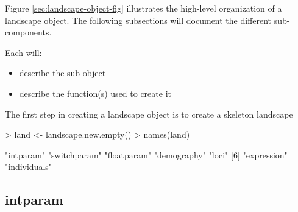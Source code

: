\documentclass[10pt]{article}
\begin{document}
Figure \ref{sec:landscape-object-fig} illustrates the high-level
organization of a landscape object.  The following subsections will
document the different sub-components.

Each will:
\begin{itemize}
\item describe the sub-object
\item describe the function(s) used to create it
\end{itemize}

The first step in creating a landscape object is to create a skeleton landscape
\begin{Schunk}
\begin{Sinput}
> land <- landscape.new.empty()
> names(land)
\end{Sinput}
\begin{Soutput}
[1] "intparam"    "switchparam" "floatparam"  "demography"  "loci"       
[6] "expression"  "individuals"
\end{Soutput}
\end{Schunk}

\subsection{intparam}
\label{sec:intparam}
\end{document}

